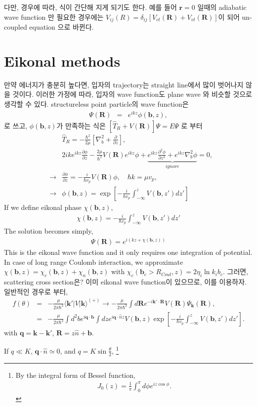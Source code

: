 \documentclass[11pt]{book}
\def\bm{\boldsymbol}
\def\vq{{\bm q}}
\def\vk{{\bm k}}
\def\vr{{\bm r}}
\def\vR{{\bm R}}
\def\la{\langle}
\def\ra{\rangle}
\newcommand{\bea}{\begin{eqnarray}}
\newcommand{\eea}{\end{eqnarray}}
\newcommand{\no}{\nonumber \\}
\newcommand{\del}{\partial}
\begin{document}
다만, 경우에 따라, 식이 간단해 지게 되기도 한다. 예를 들어 $\vr=0$ 일때의 adiabatic wave function
만 필요한 경우에는 $V_{ij}(R)=\delta_{ij}[V_{ct}(\vR)+V_{vt}(\vR)]$이 되어 un-coupled equation
으로 바뀐다.  




\section{Eikonal methods}
만약 에너지가 충분히 높다면, 입자의 trajectory는 straight line에서 많이 벗어나지
않을 것이다. 이러한 가정에 따라, 입자의 wave function도 plane wave 와 비슷할 것으로 생각할 수 있다. 
structureless point particle의 wave function은
\bea 
\Psi(\vR)&=&e^{ikz}\phi({\bm b},z), 
\eea 
로 쓰고, $\phi({\bm b},z)$가 만족하는 식은 $[\hat{T}_R+V(\vR)]\Psi=E\Psi$ 로 부터
\bea 
& &\hat{T}_R=-\frac{\hbar^2}{2\mu}\left[\nabla_b^2+\frac{\del}{\del z}\right],\no 
& &2ik e^{ikz}\frac{\del\phi}{\del z}-\frac{2\mu}{\hbar^2}V(\vR)e^{ikz}\phi 
   +\underbrace{e^{ikz}\frac{\del^2\phi}{\del z^2}
   +e^{ikz}\nabla_b^2 \phi}_{ignore} =0, \no 
&\rightarrow &  \frac{\del\phi}{\del z}=-\frac{i}{\hbar v_p}V(\vR)\phi, 
     \quad \hbar k=\mu v_p, \no 
&\rightarrow & \phi({\bm b},z) =\exp\left[-\frac{i}{\hbar v_p}\int_{-\infty}^z 
  V({\bm b},z')dz'\right] 
\eea 
If we define eikonal phase $\chi({\bm b},z)$,
\bea 
\chi({\bm b},z)= -\frac{i}{\hbar v_p}\int_{-\infty}^z 
  V({\bm b},z')dz'
\eea 
The solution becomes simply,
\bea 
\Psi(\vR)=e^{i(kz+\chi({\bm b},z))}
\eea 
This is the eikonal wave function and it only requires one integration  
of potential. In case of long range Coulomb interaction,
we approximate $\chi({\bm b},z)=\chi_c({\bm b},z)+\chi_n({\bm b},z)$
with 
$\chi_c({\bm b}_c> R_{Coul},z)=2\eta_i \ln k_i b_c$.
그러면, scattering cross section은? 이미 eikonal wave function이 있으므로,
이를 이용하자. 일반적인 경우로 부터,
\bea 
f(\theta)&=& -\frac{\mu}{2\pi\hbar^2}\la \vk'|V|\vk\ra^{(+)}
        \to -\frac{\mu}{2\pi\hbar^2}\int d\vR e^{-i\vk'\cdot\vR}
             V(\vR)\Psi_{\vk}(\vR),\no 
         &=& -\frac{\mu}{2\pi\hbar^2}\int d^2 b e^{i\vq\cdot{\bm b}}
         \int dz  e^{i\vq\cdot \hat{n} z}
                      V({\bm b},z)\exp\left[-\frac{i}{\hbar v_p}\int_{-\infty}^z 
                        V({\bm b},z')dz'\right].
\eea 
with $\vq=\vk-\vk'$, $\vR=z \hat{n}+{\bm b}$. 

If $q\ll K$, $\vq\cdot\hat{n}\simeq 0$, and $q=K\sin\frac{\theta}{2}$, 
\footnote{ By the integral form of Bessel function,
\bea 
J_0(z)=\frac{1}{\pi}\int_0^\pi d\phi e^{iz\cos\phi}.
\eea 
}
\end{document}
